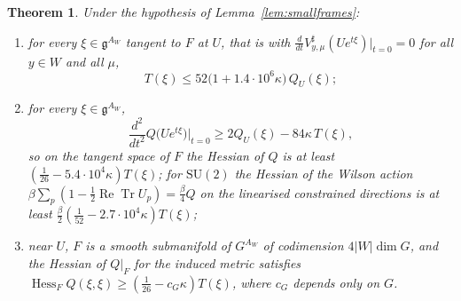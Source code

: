 \documentclass[11pt]{amsart}
\newtheorem{theorem}{Theorem}[section]
\theoremstyle{definition}
\theoremstyle{remark}
\numberwithin{equation}{section}
\newcommand{\SU}{\mathrm{SU}}
\newcommand{\g}{\mathfrak{g}}
\newcommand{\ReTr}{\operatorname{Re}\operatorname{Tr}}
\newcommand{\Hess}{\operatorname{Hess}}
\begin{document}
\begin{theorem}\label{thm:smallfibre}
Under the hypothesis of Lemma~\ref{lem:smallframes}:
\begin{enumerate}[label=\textup{(\roman*)},leftmargin=*]
\item for every $\xi\in\g^{A_W}$ tangent to $F$ at $U$, that is with
$\frac d{dt}V^\sharp_{y,\mu}(Ue^{t\xi})|_{t=0}=0$ for all $y\in W$ and all
$\mu$,
\[
T(\xi)\le52\bigl(1+1.4\cdot10^6\kappa\bigr)\,Q_U(\xi);
\]
\item for every $\xi\in\g^{A_W}$,
\[
\frac{d^2}{dt^2}Q\bigl(Ue^{t\xi}\bigr)\Big|_{t=0}\ge2Q_U(\xi)-84\kappa\,
T(\xi),
\]
so on the tangent space of $F$ the Hessian of $Q$ is at least $(\frac1{26}-
5.4\cdot10^4\kappa)T(\xi)$; for $\SU(2)$ the Hessian of the Wilson action
$\beta\sum_p(1-\frac12\ReTr U_p)=\frac\beta4Q$ on the linearised
constrained directions is at least $\frac\beta2(\frac1{52}-2.7\cdot10^4
\kappa)T(\xi)$;
\item near $U$, $F$ is a smooth submanifold of $G^{A_W}$ of codimension
$4|W|\dim G$, and the Hessian of $Q|_F$ for the induced metric satisfies
$\Hess_FQ(\xi,\xi)\ge(\frac1{26}-c_G\kappa)T(\xi)$, where $c_G$ depends only
on $G$.
\end{enumerate}
\end{theorem}
\end{document}
